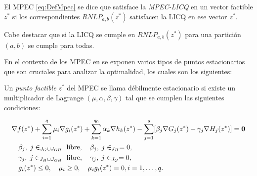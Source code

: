 \begin{definition}
El MPEC \eqref{eq:DefMpec} se dice que satisface la \textit{MPEC-LICQ}  en un vector factible $z^*$ si los correspondientes $RNLP_{a,b}(z^*)$ satisfacen la LICQ  en ese vector $z^*$.
\end{definition}
    Cabe destacar que si la LICQ se cumple en  $RNLP_{a,b}(z^*)$ para una partición $(a,b)$ se cumple para todas. 

En el contexto de los MPEC en \cite{Flegel2003AFJ} se exponen varios tipos de puntos estacionarios que son cruciales para analizar la optimalidad, los cuales son los siguientes:
\begin{definition}
    Un \textit{punto factible} $z^*$ del MPEC se llama débilmente estacionario si existe un multiplicador de Lagrange $ (\mu, \alpha, \beta, \gamma)$ tal que se cumplen las siguientes condiciones:
    
\begin{align}
& \nabla f(z^*) + \sum_{i=1}^q \mu_i\nabla g_i(z^*) + \sum_{k=1}^{q_0} \alpha_k\nabla h_k(z^*) - \sum_{j=1}^{s} [\beta_j\nabla G_j(z^*) + \gamma_j\nabla H_j(z^*)] = \vec{0} \notag\\
    & \quad \begin{aligned}
        &   \beta_j,\; j\in _{J_G\cup J_{GH}} \text{ libre}, \quad \beta_j,\; j\in _{J_H}= 0, \\
        &    \gamma_j,\; j\in _{J_H\cup J_{GH}} \text{ libre}, \quad \gamma_j,\; j\in _{J_G}= 0,  \\
        & g_i(z^*) \leq 0, \quad \mu_i \geq 0, \quad \mu_i g_i(z^*) = 0, i=1,\ldots, q.
    \end{aligned} \\
& \label{eq:Definición_punto_debilemente_estacionario} \notag
\end{align}
\end{definition}

